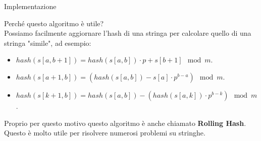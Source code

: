 \documentclass[compress]{beamer}
\begin{document}
\begin{frame}{Implementazione}
\end{frame}

\begin{frame}
    Perché questo algoritmo \`e utile?\\
    \pause
    Possiamo facilmente aggiornare l'hash di una stringa per calcolare quello di una stringa "simile", ad esempio:
    \pause
    \begin{itemize}
        \item $hash(s[a,b+1]) = hash(s[a,b]) \cdot p + s[b+1] \mod m$.
        \item $hash(s[a+1,b]) = (hash(s[a,b]) - s[a] \cdot p^{b-a}) \mod m$.
        \item $hash(s[k+1,b]) = hash(s[a,b]) - (hash(s[a,k]) \cdot p^{b-k}) \mod m$.
    \end{itemize}
    \pause
    Proprio per questo motivo questo algoritmo \`e anche chiamato \textbf{Rolling Hash}.
    Questo \`e molto utile per risolvere numerosi problemi su stringhe.
\end{frame}
\end{document}
